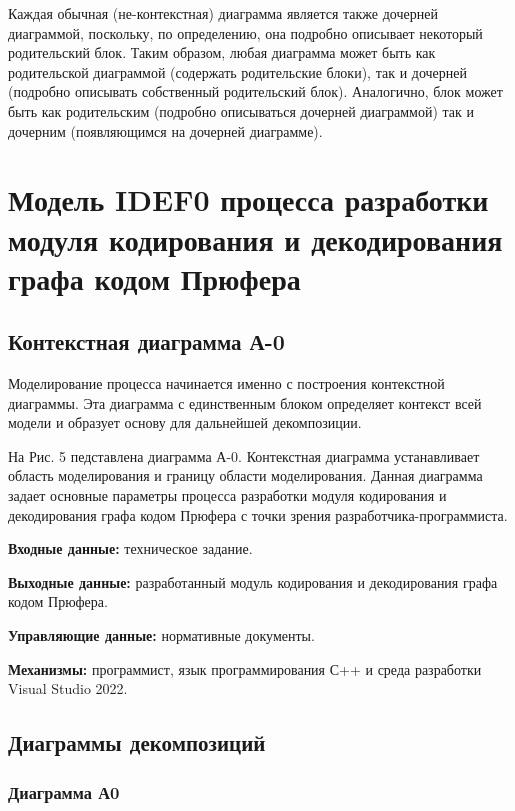 \documentclass[a4paper, final]{article}
\begin{document}
Каждая обычная (не-контекстная) диаграмма является также
дочерней диаграммой, поскольку, по определению, она подробно описывает некоторый родительский блок. Таким образом, любая диаграмма может быть как родительской диаграммой (содержать родительские блоки), так и дочерней (подробно описывать собственный родительский блок). Аналогично, блок может быть как родительским (подробно описываться дочерней диаграммой) так и дочерним (появляющимся на дочерней диаграмме). 

\newpage
\section{Модель IDEF0 процесса разработки модуля кодирования и декодирования графа кодом Прюфера}
\subsection{Контекстная диаграмма А-0}

Моделирование процесса начинается именно с построения контекстной диаграммы. Эта диаграмма с единственным блоком определяет
контекст всей модели и образует основу для дальнейшей декомпозиции. 
\par На Рис. 5 педставлена диаграмма А-0. Контекстная диаграмма устанавливает область моделирования и границу 
области моделирования. Данная диаграмма задает основные параметры процесса разработки модуля кодирования и декодирования графа
кодом Прюфера с точки зрения разработчика-программиста. 

\par {\bf Входные данные:} техническое задание.

\par {\bf Выходные данные:} разработанный модуль кодирования и декодирования графа кодом Прюфера.

\par {\bf Управляющие данные:} нормативные документы.

\par {\bf Механизмы:} программист, язык программирования С++ и среда разработки Visual Studio 2022. 

\newpage
\hypertarget{img:A-0}{}



\subsection{Диаграммы декомпозиций}
\subsubsection{Диаграмма А0}
\end{document}
